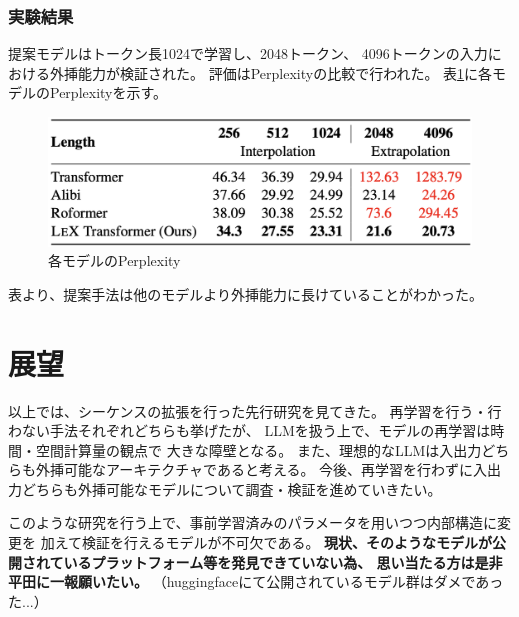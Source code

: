 \documentclass{jsarticle}
\begin{document}
    \subsubsection{実験結果}
        提案モデルはトークン長1024で学習し、2048トークン、
        4096トークンの入力における外挿能力が検証された。
        評価はPerplexityの比較で行われた。
        表\ref{tab:lex}に各モデルのPerplexityを示す。
        \begin{figure}[ht]
            \caption{各モデルのPerplexity\cite{extra}}
            \label{tab:lex}
            \centering
            \includegraphics[width=.6\hsize]{lex.png}
        \end{figure}

        表より、提案手法は他のモデルより外挿能力に長けていることがわかった。

\section{展望}
    以上では、シーケンスの拡張を行った先行研究を見てきた。
    再学習を行う・行わない手法それぞれどちらも挙げたが、
    LLMを扱う上で、モデルの再学習は時間・空間計算量の観点で
    大きな障壁となる。
    また、理想的なLLMは入出力どちらも外挿可能なアーキテクチャであると考える。
    今後、再学習を行わずに入出力どちらも外挿可能なモデルについて調査・検証を進めていきたい。

    このような研究を行う上で、事前学習済みのパラメータを用いつつ内部構造に変更を
    加えて検証を行えるモデルが不可欠である。
    \textbf{現状、そのようなモデルが公開されているプラットフォーム等を発見できていない為、
    思い当たる方は是非平田に一報願いたい。}
    （huggingfaceにて公開されているモデル群はダメであった...）
\end{document}
